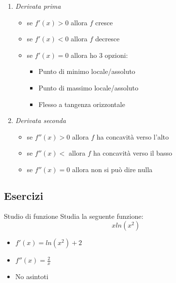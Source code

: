 \begin{enumerate}
\begin{itemize}
\begin{itemize}
		            \end{itemize}
	      \end{itemize}
	\item \textit{Derivata prima}
	      \begin{itemize}
		      \item se $ f'\left(x\right) > 0 $ allora $ f $ cresce
		      \item se $ f'\left(x\right) < 0 $ allora $ f $ decresce
		      \item se $ f'\left(x\right) = 0 $ allora ho 3 opzioni:
		            \begin{itemize}
			            \item Punto di minimo locale/assoluto
			            \item Punto di massimo locale/assoluto
			            \item Flesso a tangenza orizzontale
		            \end{itemize}
	      \end{itemize}
	\item \textit{Derivata seconda}
	      \begin{itemize}
		      \item se $ f''\left(x\right) > 0 $ allora $ f $ ha concavità verso l'alto
		      \item se $ f''\left(x\right) < $ allora $ f $ ha concavità verso il basso
		      \item se $ f''\left(x\right) = 0 $ allora non si può dire nulla
	      \end{itemize}
\end{enumerate}
\subsection{Esercizi}
\begin{esercizio}{Studio di funzione}
	Studia la seguente funzione:
	\[
		x ln\left(x^2 \right)
	\]
\end{esercizio}
\vskip3mm
\begin{itemize}
	\item $ f'\left(x\right) = ln\left(x^2 \right) + 2 $
	\item $ f''\left(x\right) = \frac{2}{x} $
	\item No asintoti
\end{itemize}


